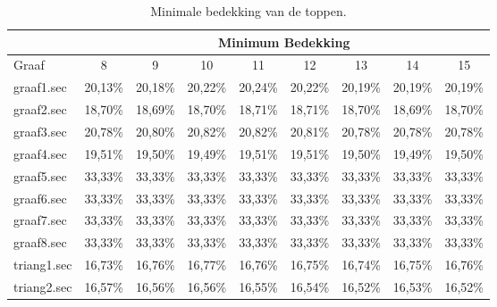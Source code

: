 \documentclass[11pt, a4paper, table]{article}
\theoremstyle{definition}
\begin{document}
\begin{table}[tbp]
	\centering
	\begin{tabular}{|l|c|c|c|c|c|c|c|c|}
		\hline
		& \multicolumn{8}{c|}{Minimum Bedekking}		\\ \hline
		Graaf & 8  & 9  & 10  & 11  & 12  & 13  & 14  & 15 		\\ \hline
		graaf1.sec &  \cellcolor{LimeGreen}20,13\% & 20,18\% & 20,22\% & 20,24\% & 20,22\% & 20,19\% & 20,19\% & 20,19\%		\\ \hline
		graaf2.sec & 18,70\% &  \cellcolor{LimeGreen}18,69\% & 18,70\% & 18,71\% & 18,71\% & 18,70\% & 18,69\% & 18,70\%		\\ \hline
		graaf3.sec &  \cellcolor{LimeGreen}20,78\% & 20,80\% & 20,82\% & 20,82\% & 20,81\% & 20,78\% & 20,78\% & 20,78\%		\\ \hline
		graaf4.sec & 19,51\% & 19,50\% &  \cellcolor{LimeGreen}19,49\% & 19,51\% & 19,51\% & 19,50\% & 19,49\% & 19,50\%		\\ \hline
		graaf5.sec &  \cellcolor{LimeGreen}33,33\% & 33,33\% & 33,33\% & 33,33\% & 33,33\% & 33,33\% & 33,33\% & 33,33\%		\\ \hline
		graaf6.sec &  \cellcolor{LimeGreen}33,33\% & 33,33\% & 33,33\% & 33,33\% & 33,33\% & 33,33\% & 33,33\% & 33,33\%		\\ \hline
		graaf7.sec &  \cellcolor{LimeGreen}33,33\% & 33,33\% & 33,33\% & 33,33\% & 33,33\% & 33,33\% & 33,33\% & 33,33\%		\\ \hline
		graaf8.sec &  \cellcolor{LimeGreen}33,33\% & 33,33\% & 33,33\% & 33,33\% & 33,33\% & 33,33\% & 33,33\% & 33,33\%		\\ \hline
		triang1.sec &  \cellcolor{LimeGreen}16,73\% & 16,76\% & 16,77\% & 16,76\% & 16,75\% & 16,74\% & 16,75\% & 16,76\%		\\ \hline
		triang2.sec & 16,57\% & 16,56\% & 16,56\% & 16,55\% & 16,54\% & 16,52\% & 16,53\% &  \cellcolor{LimeGreen}16,52\%		\\ \hline
	\end{tabular}
	\caption{Minimale bedekking van de toppen.}
	\label{tabel:bedekking2}
\end{table}
\end{document}
